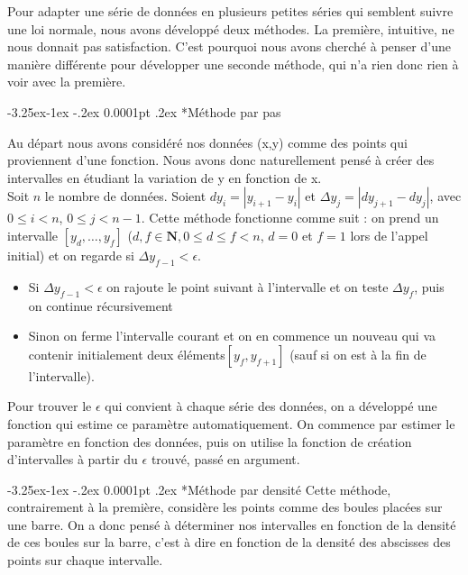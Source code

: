 \documentclass[a4paper,12pt]{article} %
\makeatletter
\renewcommand\subparagraph{\@startsection{subparagraph}{5}{\z@}%
                                      {-3.25ex\@plus -1ex \@minus -.2ex}%
                                      {0.0001pt \@plus .2ex}%
                                      {\normalfont\normalsize\bfseries}}
\makeatother
\begin{document}
    				
				   Pour adapter une série de données en plusieurs petites séries qui semblent suivre une loi normale, nous avons développé deux méthodes. La première, intuitive, ne nous donnait pas satisfaction. C'est pourquoi nous avons cherché à penser d'une manière différente pour développer une seconde méthode, qui n'a rien donc rien à voir avec la première.
				
				    \subparagraph*{Méthode par pas}
				    
    				    Au départ nous avons considéré nos données (x,y) comme des points qui proviennent d'une fonction. Nous avons donc naturellement pensé à créer des intervalles en étudiant la variation de y en fonction de x.\\
    				    
    				    Soit $n$ le nombre de données.
                        Soient $dy_i=|y_{i+1}-y_i|$  et $\Delta y_j=|dy_{j+1}-dy_j|$,  avec  $0\le i < n$, $ 0 \le j< n-1$. Cette méthode fonctionne comme suit : on prend un intervalle $[y_d,…,y_f ]$ ($d,f \in \mathbf{N}, 0 \le d \le f < n$, $d = 0$ et $f = 1$ lors de l'appel initial) et on regarde si $\Delta y_{f-1}<\epsilon$.
                        \begin{itemize}
                        \item 	Si $\Delta y_{f-1}<\epsilon$ on rajoute le point suivant à l'intervalle et on teste $\Delta y_f$, puis on continue récursivement
                        \item 	Sinon on ferme l'intervalle courant et on en commence un nouveau qui va contenir initialement deux éléments$[y_f,y_{f+1}]$ (sauf si on est à la fin de l'intervalle).
                        \end{itemize}
                        Pour trouver le $\epsilon$ qui convient à chaque série des données, on a développé une fonction qui estime ce paramètre automatiquement. On commence par estimer le paramètre en fonction des données, puis on utilise la fonction de création d'intervalles à partir du $\epsilon$ trouvé, passé en argument.
                        
				    \subparagraph*{Méthode par densité}
    				    Cette méthode, contrairement à la première, considère les points comme des boules placées sur une barre. On a donc pensé à déterminer nos intervalles en fonction de la densité de ces boules sur la barre, c'est à dire en fonction de la densité des abscisses des points sur chaque intervalle.\\
    				    
\end{document}
